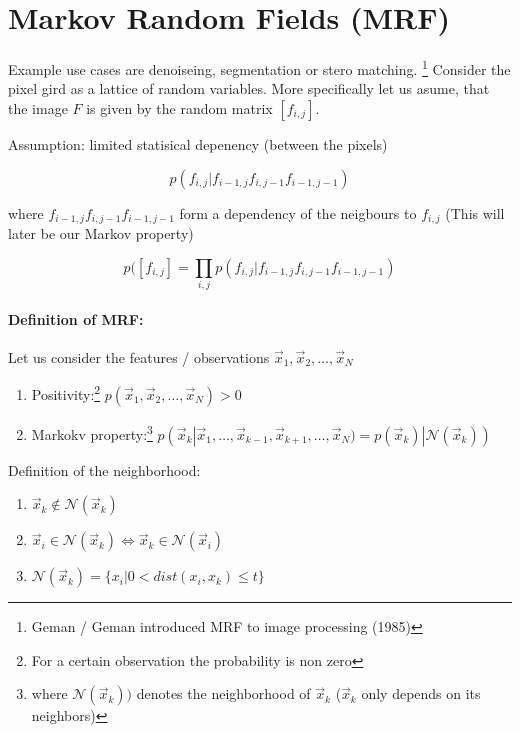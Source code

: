 
\section*{Markov Random Fields (MRF)}

Example use cases are denoiseing, segmentation or stero matching. \footnote{Geman / Geman introduced MRF to image processing (1985)} Consider the pixel gird as a lattice of random variables. More specifically let us asume, that the image $F$ is given by the random matrix $[f_{i,j}]$.

Assumption: limited statisical depenency (between the pixels)

\begin{equation*}
    p(f_{i, j} | f_{i-1, j} f_{i, j-1} f_{i-1, j-1})
\end{equation*}

where $f_{i-1, j} f_{i, j-1} f_{i-1, j-1}$ form a dependency of the neigbours to $f_{i,j}$ (This will later be our Markov property)

\begin{equation*}
    p([f_{i, j}] = \prod_{i,j} p(f_{i, j} | f_{i-1, j} f_{i, j-1} f_{i-1, j-1})
\end{equation*}

\paragraph{Definition of MRF:\\}

Let us consider the features / observations $\vec{x}_1, \vec{x}_2, \dots, \vec{x}_N$
\begin{enumerate}
    \item Positivity:\footnote{For a certain observation the probability is non zero} $ p(\vec{x}_1, \vec{x}_2, \dots, \vec{x}_N) > 0$
    \item Markokv property:\footnote{where $\mathcal{N}(\vec{x}_k))$ denotes the neighborhood of $\vec{x}_k$ ($\vec{x}_k$ only depends on its neighbors)} $ p(\vec{x}_k |\vec{x}_1, \dots, \vec{x}_{k-1}, \vec{x}_{k+1}, \dots, \vec{x}_N) = p(\vec{x}_k) | \mathcal{N}(\vec{x}_k)) $
\end{enumerate}

Definition of the neighborhood:
\begin{enumerate}
	\item $\vec{x}_k \notin \mathcal{N}(\vec{x}_k)$
	\item $\vec{x}_i \in \mathcal{N}(\vec{x}_k) \Leftrightarrow \vec{x}_k \in \mathcal{N}(\vec{x}_i)$
	\item $\mathcal{N}(\vec{x}_k) = \{x_i|0 < dist(x_i, x_k) \le t\}$
\end{enumerate}

